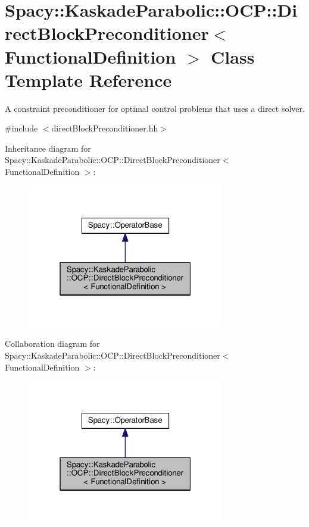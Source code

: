 \hypertarget{classSpacy_1_1KaskadeParabolic_1_1OCP_1_1DirectBlockPreconditioner}{\section{Spacy\-:\-:Kaskade\-Parabolic\-:\-:O\-C\-P\-:\-:Direct\-Block\-Preconditioner$<$ Functional\-Definition $>$ Class Template Reference}
\label{classSpacy_1_1KaskadeParabolic_1_1OCP_1_1DirectBlockPreconditioner}
}


A constraint preconditioner for optimal control problems that uses a direct solver.  




{\ttfamily \#include $<$direct\-Block\-Preconditioner.\-hh$>$}



Inheritance diagram for Spacy\-:\-:Kaskade\-Parabolic\-:\-:O\-C\-P\-:\-:Direct\-Block\-Preconditioner$<$ Functional\-Definition $>$\-:
\nopagebreak
\begin{figure}[H]
\begin{center}
\leavevmode
\includegraphics[width=244pt]{classSpacy_1_1KaskadeParabolic_1_1OCP_1_1DirectBlockPreconditioner__inherit__graph}
\end{center}
\end{figure}


Collaboration diagram for Spacy\-:\-:Kaskade\-Parabolic\-:\-:O\-C\-P\-:\-:Direct\-Block\-Preconditioner$<$ Functional\-Definition $>$\-:
\nopagebreak
\begin{figure}[H]
\begin{center}
\leavevmode
\includegraphics[width=244pt]{classSpacy_1_1KaskadeParabolic_1_1OCP_1_1DirectBlockPreconditioner__coll__graph}
\end{center}
\end{figure}
